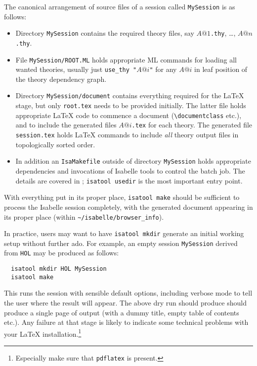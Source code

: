 \begin{isabellebody}
\begin{isamarkuptext}
  The canonical arrangement of source files of a session called
  \texttt{MySession} is as follows:

  \begin{itemize}

  \item Directory \texttt{MySession} contains the required theory
  files, say $A@1$\texttt{.thy}, \dots, $A@n$\texttt{.thy}.

  \item File \texttt{MySession/ROOT.ML} holds appropriate ML commands
  for loading all wanted theories, usually just
  \texttt{use_thy~"$A@i$"} for any $A@i$ in leaf position of the
  theory dependency graph.

  \item Directory \texttt{MySession/document} contains everything
  required for the {\LaTeX} stage, but only \texttt{root.tex} needs to
  be provided initially.  The latter file holds appropriate {\LaTeX}
  code to commence a document (\verb,\documentclass, etc.), and to
  include the generated files $A@i$\texttt{.tex} for each theory.  The
  generated file \texttt{session.tex} holds {\LaTeX} commands to
  include \emph{all} theory output files in topologically sorted
  order.

  \item In addition an \texttt{IsaMakefile} outside of directory
  \texttt{MySession} holds appropriate dependencies and invocations of
  Isabelle tools to control the batch job.  The details are covered in
  \cite{isabelle-sys}; \texttt{isatool usedir} is the most important
  entry point.

  \end{itemize}

  With everything put in its proper place, \texttt{isatool make}
  should be sufficient to process the Isabelle session completely,
  with the generated document appearing in its proper place (within
  \verb,~/isabelle/browser_info,).

  In practice, users may want to have \texttt{isatool mkdir} generate
  an initial working setup without further ado.  For example, an empty
  session \texttt{MySession} derived from \texttt{HOL} may be produced
  as follows:

\begin{verbatim}
  isatool mkdir HOL MySession
  isatool make
\end{verbatim}

  This runs the session with sensible default options, including
  verbose mode to tell the user where the result will appear.  The
  above dry run should produce should produce a single page of output
  (with a dummy title, empty table of contents etc.).  Any failure at
  that stage is likely to indicate some technical problems with your
  {\LaTeX} installation.\footnote{Especially make sure that
  \texttt{pdflatex} is present.}


\end{isamarkuptext}
\end{isabellebody}
